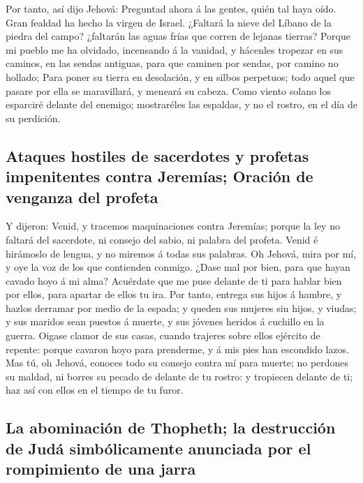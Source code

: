  Por tanto, así dijo Jehová: Preguntad ahora á las gentes,
quién tal haya oído. Gran fealdad ha hecho la virgen de Israel.
 ¿Faltará la nieve del Líbano de la piedra del campo?
¿faltarán las aguas frías que corren de lejanas tierras? 
Porque mi pueblo me ha olvidado, incensando á la vanidad, y hácenles
tropezar en sus caminos, en las sendas antiguas, para que caminen por
sendas, por camino no hollado;  Para poner su tierra en
desolación, y en silbos perpetuos; todo aquel que pasare por ella se
maravillará, y meneará su cabeza.  Como viento solano los
esparciré delante del enemigo; mostraréles las espaldas, y no el rostro,
en el día de su perdición.

\hypertarget{ataques-hostiles-de-sacerdotes-y-profetas-impenitentes-contra-jeremuxedas-oraciuxf3n-de-venganza-del-profeta}{%
\subsection{Ataques hostiles de sacerdotes y profetas impenitentes
contra Jeremías; Oración de venganza del
profeta}\label{ataques-hostiles-de-sacerdotes-y-profetas-impenitentes-contra-jeremuxedas-oraciuxf3n-de-venganza-del-profeta}}

 Y dijeron: Venid, y tracemos maquinaciones contra
Jeremías; porque la ley no faltará del sacerdote, ni consejo del sabio,
ni palabra del profeta. Venid é hirámoslo de lengua, y no miremos á
todas sus palabras.  Oh Jehová, mira por mí, y oye la voz
de los que contienden conmigo.  ¿Dase mal por bien, para
que hayan cavado hoyo á mi alma? Acuérdate que me puse delante de ti
para hablar bien por ellos, para apartar de ellos tu ira. 
Por tanto, entrega sus hijos á hambre, y hazlos derramar por medio de la
espada; y queden sus mujeres sin hijos, y viudas; y sus maridos sean
puestos á muerte, y sus jóvenes heridos á cuchillo en la guerra.
 Oigase clamor de sus casas, cuando trajeres sobre ellos
ejército de repente: porque cavaron hoyo para prenderme, y á mis pies
han escondido lazos.  Mas tú, oh Jehová, conoces todo su
consejo contra mí para muerte; no perdones su maldad, ni borres su
pecado de delante de tu rostro: y tropiecen delante de ti; haz así con
ellos en el tiempo de tu furor.

\hypertarget{la-abominaciuxf3n-de-thopheth-la-destrucciuxf3n-de-juduxe1-simbuxf3licamente-anunciada-por-el-rompimiento-de-una-jarra}{%
\subsection{La abominación de Thopheth; la destrucción de Judá
simbólicamente anunciada por el rompimiento de una
jarra}\label{la-abominaciuxf3n-de-thopheth-la-destrucciuxf3n-de-juduxe1-simbuxf3licamente-anunciada-por-el-rompimiento-de-una-jarra}}

